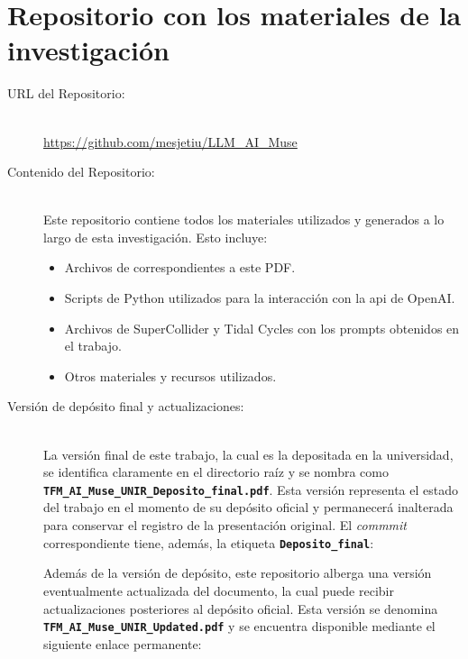\chapter{Repositorio con los materiales de la investigación}
\label{anexo:repositorio}



\begin{description}
    \item[URL del Repositorio:] \hfill \\
    \url{https://github.com/mesjetiu/LLM_AI_Muse} 
    
    \item[Contenido del Repositorio:] \hfill \\
    Este repositorio contiene todos los materiales utilizados y generados a lo largo de esta investigación. Esto incluye:
    \begin{itemize}
        \item Archivos de  correspondientes a este PDF.
        \item Scripts de Python utilizados para la interacción con la \gls{api} de OpenAI.
        \item Archivos de SuperCollider y Tidal Cycles con los {prompts} obtenidos en el trabajo.
        \item Otros materiales y recursos utilizados.
    \end{itemize}
    
    \item[Versión de depósito final y actualizaciones:] \hfill \\
    La versión final de este trabajo, la cual es la depositada en la universidad, se identifica claramente en el directorio raíz y se nombra como \textbf{\texttt{TFM\_AI\_Muse\_UNIR\_Deposito\_final.pdf}}. Esta versión representa el estado del trabajo en el momento de su depósito oficial y permanecerá inalterada para conservar el registro de la presentación original. El \emph{commmit} correspondiente tiene, además, la etiqueta \textbf{\texttt{Deposito\_final}}:


    Además de la versión de depósito, este repositorio alberga una versión eventualmente actualizada del documento, la cual puede recibir actualizaciones posteriores al depósito oficial. Esta versión se denomina \textbf{\texttt{TFM\_AI\_Muse\_UNIR\_Updated.pdf}} y se encuentra disponible mediante el siguiente enlace permanente:


\end{description}
